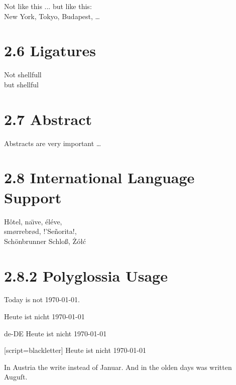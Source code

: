 \documentclass{article}
\begin{document}
Not like this ...
but like this:\\
New York, Tokyo,
Budapest, \ldots

\section{2.6 Ligatures}

Not shellfull\\
but shell\mbox{}ful

\section{2.7 Abstract}

\begin{abstract}
    This paper will talk about 
    abstract.
\end{abstract}

Abstracts are very important \ldots

\section{2.8 International Language Support}

H\^otel, na\"{\i}ve, \'el\'eve, \\
sm{\o}rrebr{\o}d, !'Se\~norita!, \\
Sch\"onbrunner Schlo\ss, \.Z\'o\l\'c

\section{2.8.2 Polyglossia Usage}

Today is not \today.

\begin{german}
  Heute ist nicht \today\\
\end{german}

\begin{lang}{de-DE}
  Heute ist nicht \today\\
\end{lang}

\begin{german}[script=blackletter]
  Heute ist nicht \today\\
\end{german}

In Austria the write
instead of \textgerman{Januar}. And in the olden
days  was written 
\textgerman[script=blackletter]{Auguſt}.
\end{document}
